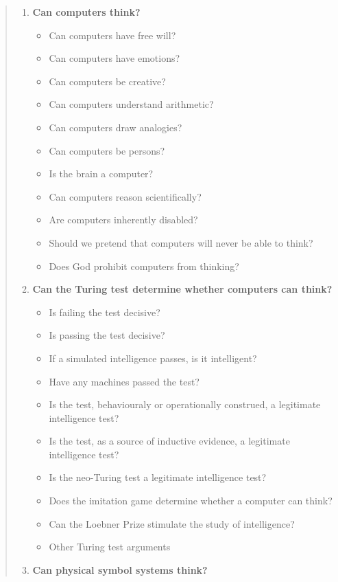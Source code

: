 \begin{quotation}
  \begin{enumerate}
    \item \textbf{Can computers think?}
      \begin{itemize}
        \item Can computers have free will?
        \item Can computers have emotions?
        \item Can computers be creative?
        \item Can computers understand arithmetic?
        \item Can computers draw analogies?
        \item Can computers be persons?
        \item Is the brain a computer?
        \item Can computers reason scientifically?
        \item Are computers inherently disabled?
        \item Should we pretend that computers will never be able to think?
        \item Does God prohibit computers from thinking?
      \end{itemize}
    \item \textbf{Can the Turing test determine whether computers can think?}
      \begin{itemize}
        \item Is failing the test decisive?
        \item Is passing the test decisive?
        \item If a simulated intelligence passes, is it intelligent?
        \item Have any machines passed the test?
        \item Is the test, behaviouraly or operationally construed, a legitimate intelligence test?
        \item Is the test, as a source of inductive evidence, a legitimate intelligence test?
        \item Is the neo-Turing test a legitimate intelligence test?
        \item Does the imitation game determine whether a computer can think?
        \item Can the Loebner Prize stimulate the study of intelligence?
        \item Other Turing test arguments
      \end{itemize}
    \item \textbf{Can physical symbol systems think?}

\end{enumerate}
\end{quotation}
